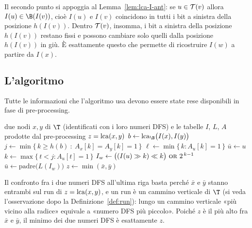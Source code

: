\begin{osservazione}
  Il secondo punto si appoggia al Lemma~\ref{lem:lca-I-ant}: se
  $u\in\mathcal{T}(v)$ allora $I(u)\in\B(I(v))$, cioè $I(u)$ e $I(v)$ coincidono in tutti i
  bit a sinistra della posizione $h(I(v))$. Dentro $\mathcal{T}(v)$, insomma, i bit a
  sinistra della posizione $h(I(v))$ restano fissi e possono cambiare solo quelli dalla
  posizione $h(I(v))$ in giù. È esattamente questo che permette di ricostruire $I(w)$ a
  partire da $I(x)$.
\end{osservazione}

\subsection{L'algoritmo}

\begin{osservazione}
  Tutte le informazioni che l'algoritmo usa devono essere state rese disponibili in
  fase di pre-processing.
\end{osservazione}

\begin{algorithm}[H]
  \caption{Query $\lca(x,y)$ in tempo costante}
  \label{alg:lca-query}
  \begin{algorithmic}[1]
    \Require due nodi $x,y$ di $\T$ (identificati con i loro numeri DFS) e le tabelle
      $I$, $L$, $A$ prodotte dal pre-processing
    \Ensure $z=\operatorname{lca}(x,y)$
    \State $b \gets \lca_{\B}\bigl(I(x),I(y)\bigr)$
    \State $j \gets \min\bigl\{\,k \ge h(b)\ :\ A_x[k]=A_y[k]=1\,\bigr\}$
     
      \State $\ell \gets \min\{\,k : A_u[k]=1\,\}$
        \State $\bar u \gets u$
      \Else
        \State $k \gets \max\{\,t < j : A_u[t]=1\,\}$ 
        \State $I_w \gets \bigl((I(u) \gg k)\ll k\bigr)\ \textsc{or}\ 2^{\,k-1}$
        \State $\bar u \gets \mathrm{padre}\bigl(L(I_w)\bigr)$
      \EndIf
    \EndFor
    \State \Return $z \gets \min(\bar x,\bar y)$
  \end{algorithmic}
\end{algorithm}


\begin{osservazione}
  Il confronto fra i due numeri DFS all'ultima riga basta perché $\bar x$ e $\bar y$
  stanno entrambi sul run di $z=\operatorname{lca}(x,y)$, e un run è un cammino verticale di $\T$
  (si veda l'osservazione dopo la Definizione~\ref{def:run}): lungo un cammino
  verticale «più vicino alla radice»
  equivale a «numero DFS più piccolo». Poiché $z$ è il più alto fra $\bar x$ e
  $\bar y$, il minimo dei due numeri DFS è esattamente $z$.
\end{osservazione}

